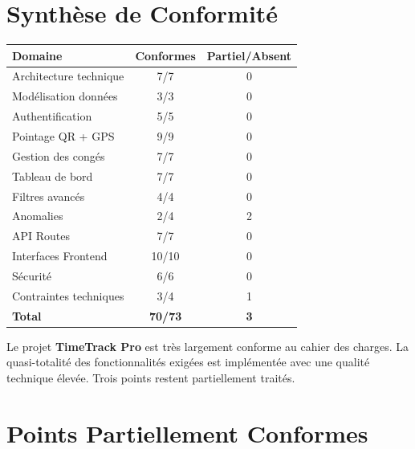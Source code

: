 \documentclass[12pt,a4paper]{article}
\newcommand{\cmark}{\textcolor{vert}{\ding{51}}}
\begin{document}
\section{Synthèse de Conformité}

\begin{tcolorbox}[colback=grislight, colframe=headerblue, title=\textbf{Tableau récapitulatif global}]
\begin{center}
\begin{tabular}{lcc}
\toprule
\textbf{Domaine} & \textbf{Conformes} & \textbf{Partiel/Absent} \\
\midrule
Architecture technique & 7/7 & 0 \\
Modélisation données & 3/3 & 0 \\
Authentification & 5/5 & 0 \\
Pointage QR + GPS & 9/9 & 0 \\
Gestion des congés & 7/7 & 0 \\
Tableau de bord & 7/7 & 0 \\
Filtres avancés & 4/4 & 0 \\
Anomalies & 2/4 & 2 \\
API Routes & 7/7 & 0 \\
Interfaces Frontend & 10/10 & 0 \\
Sécurité & 6/6 & 0 \\
Contraintes techniques & 3/4 & 1 \\
\midrule
\textbf{Total} & \textbf{70/73} & \textbf{3} \\
\bottomrule
\end{tabular}
\end{center}
\end{tcolorbox}

\vspace{0.5cm}
\begin{tcolorbox}[colback=green!8, colframe=vert, title=\textbf{\cmark~Taux de conformité global : 95.9\%}]
Le projet \textbf{TimeTrack Pro} est très largement conforme au cahier des charges. La quasi-totalité des fonctionnalités exigées est implémentée avec une qualité technique élevée. Trois points restent partiellement traités.
\end{tcolorbox}

\section{Points Partiellement Conformes}
\end{document}
